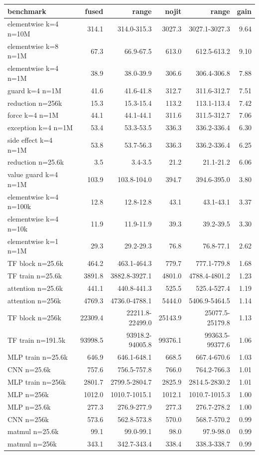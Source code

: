\begin{tabular}{lrrrrr}
\toprule
benchmark & fused & range & nojit & range & gain \\
\midrule
elementwise k=4 n=10M & 314.1 & 314.0-315.3 & 3027.3 & 3027.1-3027.3 & 9.64 \\
elementwise k=8 n=1M & 67.3 & 66.9-67.5 & 613.0 & 612.5-613.2 & 9.10 \\
elementwise k=4 n=1M & 38.9 & 38.0-39.9 & 306.6 & 306.4-306.8 & 7.88 \\
guard k=4 n=1M & 41.6 & 41.6-41.8 & 312.7 & 311.6-312.7 & 7.51 \\
reduction n=256k & 15.3 & 15.3-15.4 & 113.2 & 113.1-113.4 & 7.42 \\
force k=4 n=1M & 44.1 & 44.1-44.1 & 311.6 & 311.5-312.7 & 7.06 \\
exception k=4 n=1M & 53.4 & 53.3-53.5 & 336.3 & 336.2-336.4 & 6.30 \\
side effect k=4 n=1M & 53.8 & 53.7-56.3 & 336.3 & 336.2-336.4 & 6.25 \\
reduction n=25.6k & 3.5 & 3.4-3.5 & 21.2 & 21.1-21.2 & 6.06 \\
value guard k=4 n=1M & 103.9 & 103.8-104.0 & 394.7 & 394.6-395.0 & 3.80 \\
elementwise k=4 n=100k & 12.8 & 12.8-12.8 & 43.1 & 43.1-43.1 & 3.37 \\
elementwise k=4 n=10k & 11.9 & 11.9-11.9 & 39.3 & 39.2-39.5 & 3.30 \\
elementwise k=1 n=1M & 29.3 & 29.2-29.3 & 76.8 & 76.8-77.1 & 2.62 \\
TF block n=25.6k & 464.2 & 463.1-464.3 & 779.7 & 777.1-779.8 & 1.68 \\
TF train n=25.6k & 3891.8 & 3882.8-3927.1 & 4801.0 & 4788.4-4801.2 & 1.23 \\
attention n=25.6k & 441.1 & 440.8-441.3 & 525.5 & 525.4-527.4 & 1.19 \\
attention n=256k & 4769.3 & 4736.0-4788.1 & 5444.0 & 5406.9-5464.5 & 1.14 \\
TF block n=256k & 22309.4 & 22211.8-22499.0 & 25143.9 & 25077.5-25179.8 & 1.13 \\
TF train n=191.5k & 93998.5 & 93918.2-94005.8 & 99376.1 & 99363.5-99377.6 & 1.06 \\
MLP train n=25.6k & 646.9 & 646.1-648.1 & 668.5 & 667.4-670.6 & 1.03 \\
CNN n=25.6k & 757.6 & 756.5-757.8 & 766.0 & 764.2-766.3 & 1.01 \\
MLP train n=256k & 2801.7 & 2799.5-2804.7 & 2825.9 & 2814.5-2830.2 & 1.01 \\
MLP n=256k & 1012.0 & 1010.7-1015.1 & 1012.1 & 1010.7-1015.3 & 1.00 \\
MLP n=25.6k & 277.3 & 276.9-277.9 & 277.3 & 276.7-278.2 & 1.00 \\
CNN n=256k & 573.6 & 562.8-573.8 & 570.0 & 568.7-570.2 & 0.99 \\
matmul n=25.6k & 99.1 & 99.0-99.1 & 98.0 & 97.9-98.0 & 0.99 \\
matmul n=256k & 343.1 & 342.7-343.4 & 338.4 & 338.3-338.7 & 0.99 \\
\bottomrule
\end{tabular}
